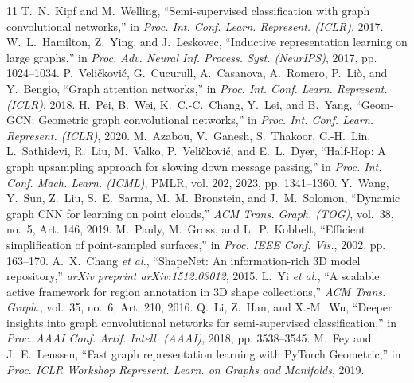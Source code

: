 \documentclass[journal]{IEEEtran}
\begin{document}
\begin{thebibliography}{11}
 T.~N.~Kipf and M.~Welling, ``Semi-supervised classification with graph convolutional networks,'' in \textit{Proc. Int. Conf. Learn. Represent. (ICLR)}, 2017.
 W.~L.~Hamilton, Z.~Ying, and J.~Leskovec, ``Inductive representation learning on large graphs,'' in \textit{Proc. Adv. Neural Inf. Process. Syst. (NeurIPS)}, 2017, pp. 1024--1034.
 P.~Veli\v{c}kovi\'c, G.~Cucurull, A.~Casanova, A.~Romero, P.~Li\`o, and Y.~Bengio, ``Graph attention networks,'' in \textit{Proc. Int. Conf. Learn. Represent. (ICLR)}, 2018.
 H.~Pei, B.~Wei, K.~C.-C.~Chang, Y.~Lei, and B.~Yang, ``Geom-GCN: Geometric graph convolutional networks,'' in \textit{Proc. Int. Conf. Learn. Represent. (ICLR)}, 2020.
 M.~Azabou, V.~Ganesh, S.~Thakoor, C.-H.~Lin, L.~Sathidevi, R.~Liu, M.~Valko, P.~Veli\v{c}kovi\'c, and E.~L.~Dyer, ``Half-Hop: A graph upsampling approach for slowing down message passing,'' in \textit{Proc. Int. Conf. Mach. Learn. (ICML)}, PMLR, vol. 202, 2023, pp. 1341--1360.
 Y.~Wang, Y.~Sun, Z.~Liu, S.~E.~Sarma, M.~M.~Bronstein, and J.~M.~Solomon, ``Dynamic graph CNN for learning on point clouds,'' \textit{ACM Trans. Graph. (TOG)}, vol.~38, no.~5, Art. 146, 2019.
 M.~Pauly, M.~Gross, and L.~P.~Kobbelt, ``Efficient simplification of point-sampled surfaces,'' in \textit{Proc. IEEE Conf. Vis.}, 2002, pp. 163--170.
 A.~X.~Chang \textit{et al.}, ``ShapeNet: An information-rich 3D model repository,'' \textit{arXiv preprint arXiv:1512.03012}, 2015.
 L.~Yi \textit{et al.}, ``A scalable active framework for region annotation in 3D shape collections,'' \textit{ACM Trans. Graph.}, vol.~35, no.~6, Art. 210, 2016.
 Q.~Li, Z.~Han, and X.-M.~Wu, ``Deeper insights into graph convolutional networks for semi-supervised classification,'' in \textit{Proc. AAAI Conf. Artif. Intell. (AAAI)}, 2018, pp. 3538--3545.
 M.~Fey and J.~E.~Lenssen, ``Fast graph representation learning with PyTorch Geometric,'' in \textit{Proc. ICLR Workshop Represent. Learn. on Graphs and Manifolds}, 2019.
\end{thebibliography}
\end{document}
